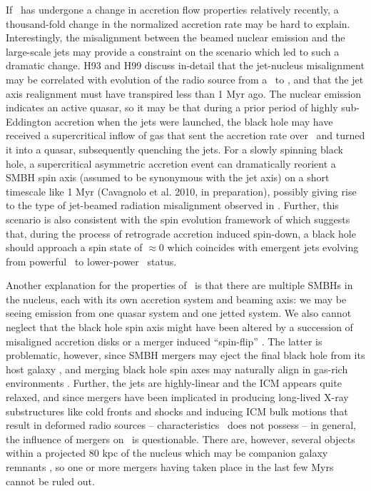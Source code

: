 \documentclass[useAMS,usenatbib]{mn2e}
\begin{document}
If \irs\ has undergone a change in accretion flow properties
relatively recently, a thousand-fold change in the normalized
accretion rate may be hard to explain. Interestingly, the misalignment
between the beamed nuclear emission and the large-scale jets may
provide a constraint on the scenario which led to such a dramatic
change. H93 and H99 discuss in-detail that the jet-nucleus
misalignment may be correlated with evolution of the radio source from
a \frii\ to \fri, and that the jet axis realignment must have
transpired less than 1 Myr ago. The nuclear emission indicates an
active quasar, so it may be that during a prior period of highly
sub-Eddington accretion when the jets were launched, the black hole
may have received a supercritical inflow of gas that sent the
accretion rate over \dmcrit\ and turned it into a quasar, subsequently
quenching the jets. For a slowly spinning black hole, a supercritical
asymmetric accretion event can dramatically reorient a SMBH spin axis
(assumed to be synonymous with the jet axis) on a short timescale like
1 Myr (Cavagnolo et al. 2010, in preparation), possibly giving rise to
the type of jet-beamed radiation misalignment observed in
\irs. Further, this scenario is also consistent with the spin
evolution framework of \citet{gesspin} which suggests that, during the
process of retrograde accretion induced spin-down, a black hole should
approach a spin state of $\approx 0$ which coincides with emergent
jets evolving from powerful \frii\ to lower-power \fri\ status.

Another explanation for the properties of \irs\ is that there are
multiple SMBHs in the nucleus, each with its own accretion system and
beaming axis: we may be seeing emission from one quasar system and one
jetted system. We also cannot neglect that the black hole spin axis
might have been altered by a succession of misaligned accretion disks
\citep[\eg][]{2005MNRAS.363...49K} or a merger induced ``spin-flip''
\citep{2002Sci...297.1310M}. The latter is problematic, however, since
SMBH mergers may eject the final black hole from its host galaxy
\citep[\eg][]{2007ApJ...659L...5C}, and merging black hole spin axes
may naturally align in gas-rich environments
\citep{2007ApJ...661L.147B}. Further, the jets are highly-linear and
the ICM appears quite relaxed, and since mergers have been implicated
in producing long-lived X-ray substructures like cold fronts and
shocks \citep{2007PhR...443....1M} and inducing ICM bulk motions that
result in deformed radio sources \citep{2009A&A...495..721S} --
characteristics \irs\ does not possess -- in general, the influence of
mergers on \irs\ is questionable. There are, however, several objects
within a projected 80 kpc of the nucleus which may be companion galaxy
remnants \citep{1996AJ....111..649S, 1999Ap&SS.266..113A}, so one or
more mergers having taken place in the last few Myrs cannot be ruled
out.
\end{document}
